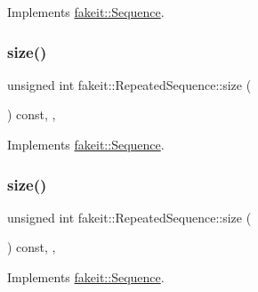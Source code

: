 Implements \mbox{\hyperlink{classfakeit_1_1Sequence_aa9a45b45fc715148832a9dfb7b555556}{fakeit\+::\+Sequence}}.

\mbox{\label{classfakeit_1_1RepeatedSequence_a64d52ac14ca69a34e8188e856e6b51a6}} 
\subsubsection{\texorpdfstring{size()}{size()}\hspace{0.1cm}{\footnotesize\ttfamily [2/9]}}
{\footnotesize\ttfamily unsigned int fakeit\+::\+Repeated\+Sequence\+::size (\begin{DoxyParamCaption}{ }\end{DoxyParamCaption}) const\hspace{0.3cm}{\ttfamily [inline]}, {\ttfamily [override]}, {\ttfamily [virtual]}}



Implements \mbox{\hyperlink{classfakeit_1_1Sequence_aa9a45b45fc715148832a9dfb7b555556}{fakeit\+::\+Sequence}}.

\mbox{\label{classfakeit_1_1RepeatedSequence_a64d52ac14ca69a34e8188e856e6b51a6}} 
\subsubsection{\texorpdfstring{size()}{size()}\hspace{0.1cm}{\footnotesize\ttfamily [3/9]}}
{\footnotesize\ttfamily unsigned int fakeit\+::\+Repeated\+Sequence\+::size (\begin{DoxyParamCaption}{ }\end{DoxyParamCaption}) const\hspace{0.3cm}{\ttfamily [inline]}, {\ttfamily [override]}, {\ttfamily [virtual]}}



Implements \mbox{\hyperlink{classfakeit_1_1Sequence_aa9a45b45fc715148832a9dfb7b555556}{fakeit\+::\+Sequence}}.

\mbox{\label{classfakeit_1_1RepeatedSequence_a64d52ac14ca69a34e8188e856e6b51a6}} 
